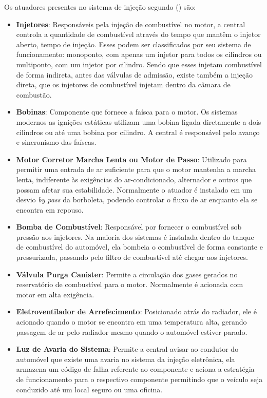Os atuadores presentes no sistema de injeção segundo \citeauthor{bosch2004} (\citeyear{bosch2004}) são:

\begin{itemize}
	\item \textbf{Injetores}: Responsáveis pela injeção de combustível no motor, a central controla a quantidade de combustível através do tempo que mantêm o injetor aberto, tempo de injeção. Esses podem ser classificados por seu sistema de funcionamento: monoponto, com apenas um injetor para todos os cilindros ou multiponto, com um injetor por cilindro. Sendo que esses injetam combustível de forma indireta, antes das válvulas de admissão, existe também a injeção direta, que os injetores de combustível injetam dentro da câmara de combustão.
	\item \textbf{Bobinas}: Componente que fornece a faísca para o motor. Os sistemas modernos as ignições estáticas utilizam uma bobina ligada diretamente a dois cilindros ou até uma bobina por cilindro. A central é responsável pelo avanço e sincronismo das faíscas.
	\item \textbf{Motor Corretor Marcha Lenta ou Motor de Passo}: Utilizado para permitir uma entrada de ar suficiente para que o motor mantenha a marcha lenta, indiferente às exigências do ar-condicionado, alternador e outros que possam afetar sua estabilidade. Normalmente o atuador é instalado em um desvio \textit{by pass} da borboleta, podendo controlar o fluxo de ar enquanto ela se encontra em repouso.
	\item \textbf{Bomba de Combustível}: Responsável por fornecer o combustível sob pressão aos injetores. Na maioria dos sistemas é instalada dentro do tanque de combustível do automóvel, ela bombeia o combustível de forma constante e pressurizada, passando pelo filtro de combustível até chegar aos injetores.
	\item \textbf{Válvula Purga Canister}: Permite a circulação dos gases gerados no reservatório de combustível para o motor. Normalmente é acionada com motor em alta exigência.
	\item \textbf{Eletroventilador de Arrefecimento}: Posicionado atrás do radiador, ele é acionado quando o motor se encontra em uma temperatura alta, gerando passagem de ar pelo radiador mesmo quando o automóvel estiver parado.
	\item \textbf{Luz de Avaria do Sistema}: Permite a central avisar ao condutor do automóvel que existe uma avaria no sistema da injeção eletrônica, ela armazena um código de falha referente ao componente e aciona a estratégia de funcionamento para o respectivo componente permitindo que o veículo seja conduzido até um local seguro ou uma oficina. 
\end{itemize}

